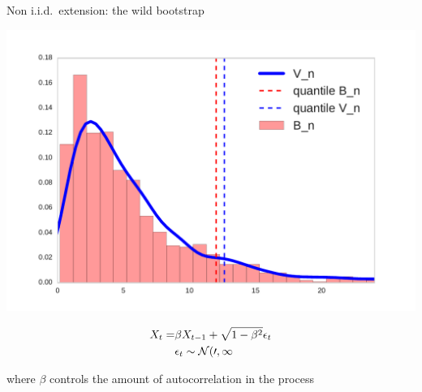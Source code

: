 \begin{frame}
\begin{columns}
\begin{column}{.33\linewidth}
\begin{block}{Non i.i.d.\ extension: the wild bootstrap}
 \begin{center}
  \begin{minipage}{.49\linewidth}
 \includegraphics[width=\textwidth]{../../presentation/img/bootstrapWorks7.pdf}
  \end{minipage}
\begin{minipage}{.49\linewidth}
\begin{align*}
 X_t =& \beta X_{t-1} + \sqrt{1 - \beta^2}\epsilon_t\\
 & \epsilon_t \sim \cal N(0,1
\end{align*}

 where $\beta$ controls the amount of autocorrelation in the process
\end{minipage}
\end{center}

 
\end{block}
\end{column}



\end{columns}
\end{frame}
